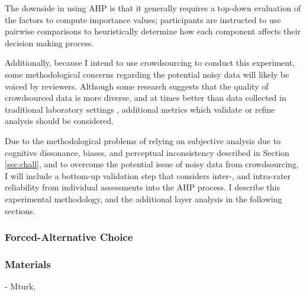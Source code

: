 The downside in using AHP is that it generally requires a top-down evaluation of the factors to compute importance values; participants are instructed to use pairwise comparisons to heuristically determine how each component affects their decision making process.

Additionally, because I intend to use crowdsourcing to conduct this experiment, some methodological concerns regarding the potential noisy data will likely be voiced by reviewers. Although some research suggests that the quality of crowdsourced data is more diverse, and at times better than data collected in traditional laboratory settings \cite{behrend2011viability}, additional metrics which validate or refine analysis should be considered. 

Due to the methodological problems of relying on subjective analysis due to cognitive dissonance, biases, and perceptual inconsistency described in Section \ref{sec:chall}, and to overcome the potential issue of noisy data from crowdsourcing, I will include a bottom-up validation step that considers inter-, and intra-rater reliability from individual assessments into the AHP process. I describe this experimental methodology, and the additional layer analysis in the following sections.

\subsubsection{Forced-Alternative Choice}

\subsubsection{Materials}
- Mturk, 